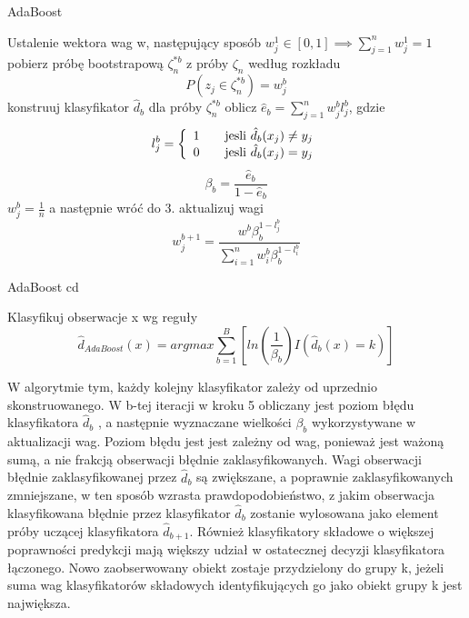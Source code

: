 \documentclass{classrep}
\begin{document}
\begin{algorithm}[h]
\caption{AdaBoost}
\label{adaboost}
\begin{algorithmic}[1]
\STATE Ustalenie wektora wag w, następujący sposób $w^{1} _{j} \in [0,1] \implies \sum \limits ^{n} _{j=1} w^{1} _{j} = 1$
\STATE pobierz próbę bootstrapową $\zeta ^{*b} _{n}$ z próby $\zeta _{n}$ według rozkładu 
\[ P(z_{j} \in \zeta ^{*b} _{n} ) = w ^{b} _j \]
\STATE konstruuj klasyfikator $\hat{d}_b$ dla próby  $\zeta ^{*b} _{n}$
\STATE oblicz $\hat{e} _{b} = \sum \limits ^{n} _{j=1} w^{b} _{j} l ^{b} _{j}$, gdzie
\[
l ^{b} _{j}  = \left\{ 
   \begin{array}{l l}
     1 & \quad \text{jesli $\hat{d}_b(x_j) \neq y_j$}\\
     0 & \quad \text{jesli $\hat{d}_b(x_j) = y_j$}\\
   \end{array} \right.
   \]
\STATE
\[
\beta _{b} = \frac{\hat{e} _{b}}{1 - \hat{e} _{b}}
\]
\ELSE
\STATE $w^{b} _{j} = \frac{1}{n}$ a następnie wróć do 3.
\ENDIF
\STATE aktualizuj wagi
\[
w^{b+1} _{j} = \frac{w^{b} \beta ^{1-l^{b} _{j}} _{b}}{\sum \limits ^{n} _{i=1} w ^{b} _{i} \beta ^{1-l ^{b} _{i}} _{b}}
\]
\ENDFOR

\end{algorithmic}
\end{algorithm}

\begin{algorithm}[h]
\caption{AdaBoost cd}
\label{adaboost2}
\begin{algorithmic}[13,1]
\STATE Klasyfikuj obserwacje x wg reguły
\[
\hat{d} _{AdaBoost} (x)= arg max \sum \limits ^{B} _{b=1} \left[ ln \left( \frac{1} {\beta _{b}}  \right) I \left( \hat{d}_b (x) = k \right) \right]
\]

\end{algorithmic}
\end{algorithm}

W algorytmie tym, każdy kolejny klasyfikator zależy od uprzednio skonstruowanego. W b-tej iteracji w kroku 5 obliczany jest poziom błędu klasyfikatora $\hat{d}_{b}$ , a następnie wyznaczane wielkości $\beta _b $ wykorzystywane w aktualizacji wag. Poziom błędu jest jest zależny od wag, ponieważ jest ważoną sumą, a nie frakcją obserwacji błędnie zaklasyfikowanych.  Wagi obserwacji błędnie zaklasyfikowanej przez $\hat{d}_{b}$ są zwiększane, a poprawnie zaklasyfikowanych zmniejszane, w ten sposób wzrasta prawdopodobieństwo, z jakim obserwacja klasyfikowana błędnie przez klasyfikator $\hat{d}_{b}$ zostanie wylosowana jako element próby uczącej klasyfikatora $\hat{d}_{b+1}$. Również klasyfikatory składowe o większej poprawności predykcji mają większy udział w ostatecznej decyzji klasyfikatora łączonego. Nowo zaobserwowany obiekt zostaje przydzielony do grupy k, jeżeli suma wag klasyfikatorów składowych identyfikujących go jako obiekt grupy k jest największa.  
\end{document}
